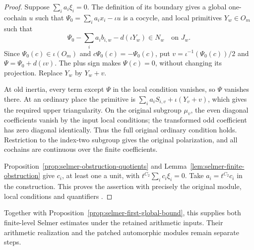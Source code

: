 \begin{proof}
Suppose $\sum_i a_i\xi_i=0$. The definition of its boundary gives
a global one-cochain $u$ such that
$\Psi_0=\sum_i a_ix_i-\iota u$ is a cocycle, and local primitives
$Y_w\in O_m$ such that
\[
          \Psi_0-\sum_i a_i b_{i,w}-d(\iota Y_w)\in N_w
                     \quad\text{on }J_w.
\]
Since $\Psi_0(c)\in\iota(O_m)$ and $c\Psi_0(c)=-\Psi_0(c)$,
put $v=\iota^{-1}(\Psi_0(c))/2$ and
$\Psi=\Psi_0+d(\iota v)$. The plus sign makes $\Psi(c)=0$,
without changing its projection. Replace $Y_w$ by $Y_w+v$.

At old inertia, every term except $\Psi$ in the local condition
vanishes, so $\Psi$ vanishes there. At an ordinary place the
primitive is $\sum_i a_iS_{i,v}+\iota(Y_v+v)$, which gives the
required upper triangularity. On the original subgroup $\mu_v$,
the even diagonal coefficients vanish by the input local conditions;
the transformed odd coefficient has zero diagonal identically.
Thus the full original ordinary condition holds. Restriction to
the index-two subgroup gives the original polarization, and all
cochains are continuous over the finite coefficients.

Proposition~\ref{prop:selmer-obstruction-quotients} and
Lemma~\ref{lem:selmer-finite-obstruction} give $c_i$, at least one
a unit, with $t^{C_2}\sum_i c_i\xi_i=0$. Take $a_i=t^{C_2}c_i$
in the construction. This proves the assertion with precisely the
original module, local conditions and quantifiers
\cite{alpo-second-global-selmer}.
\end{proof}

Together with Proposition~\ref{prop:selmer-first-global-bound},
this supplies both finite-level Selmer estimates under the retained
arithmetic inputs. Their arithmetic realization and the patched
automorphic modules remain separate steps.
